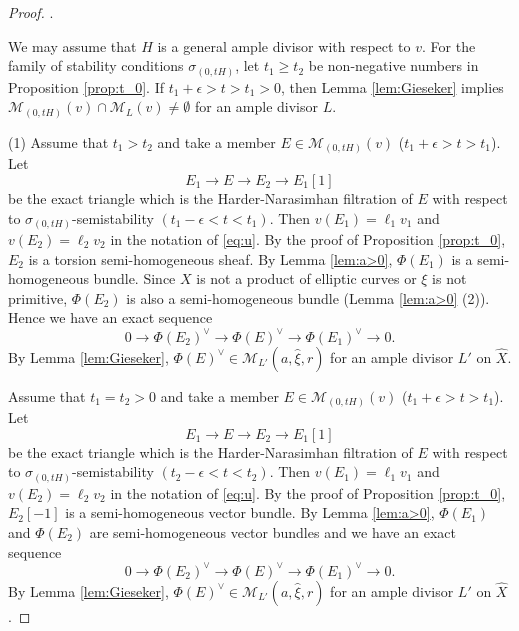 \documentclass[10pt]{amsart}
\def\cal{\mathcal}
\newenvironment{NB}{
\color{red}{\bf NB}. \footnotesize 
}{}
\newcommand{\Coh}{\operatorname{Coh}}
\newcommand{\rk}{\operatorname{rk}}
\numberwithin{equation}{section}
\theoremstyle{plain}
\theoremstyle{definition}
\theoremstyle{remark}
\begin{document}
\begin{proof}
\begin{NB}
We may assume that $H$ is a general ample divisor with respect to $v$.
\end{NB}
For the family of stability conditions
$\sigma_{(0,tH)}$, let $t_1 \geq t_2$ be non-negative numbers in Proposition \ref{prop:t_0}.
If $t_1+\epsilon> t>t_1>0$, then Lemma \ref{lem:Gieseker} implies
${\cal M}_{(0,tH)}(v) \cap {\cal M}_L(v) \ne \emptyset$ for an ample divisor $L$.

(1)
Assume that $t_1>t_2$ and take a member $E \in {\cal M}_{(0,tH)}(v)$ ($t_1+\epsilon> t>t_1$).
Let   
\begin{equation}\label{eq:HNFt1}
E_1 \to E \to E_2 \to E_1[1]
\end{equation}
be the exact triangle
which is the Harder-Narasimhan filtration of $E$ 
with respect to $\sigma_{(0,tH)}$-semistability $(t_1-\epsilon<t<t_1)$. 
Then $v(E_1)=\ell_1 v_1$ and $v(E_2)=\ell_2 v_2$ in the notation of \eqref{eq:u}.
By the proof of Proposition \ref{prop:t_0},
$E_2$ is a torsion semi-homogeneous sheaf.
By Lemma \ref{lem:a>0}, $\Phi(E_1)$ is a semi-homogeneous bundle.
Since $X$ is not a product of elliptic curves or $\xi$ is not primitive,
$\Phi(E_2)$
is also a semi-homogeneous bundle (Lemma \ref{lem:a>0} (2)).
Hence we have an exact sequence
$$
0 \to \Phi(E_2)^{\vee} \to \Phi(E)^{\vee} \to \Phi(E_1)^{\vee} \to 0.
$$
By Lemma \ref{lem:Gieseker}, 
$\Phi(E)^{\vee} \in {\cal M}_{L'}(a,\widehat{\xi},r)$ for an ample divisor $L'$ 
on $\widehat{X}$.

Assume that $t_1=t_2>0$
and take a member $E \in {\cal M}_{(0,tH)}(v)$ ($t_1+\epsilon> t>t_1$).
Let   
\begin{equation}\label{eq:HNFt0}
E_1 \to E \to E_2 \to E_1[1]
\end{equation}
be the exact triangle
which is the Harder-Narasimhan filtration of $E$ 
with respect to $\sigma_{(0,tH)}$-semistability $(t_2-\epsilon <t<t_2)$. 
Then $v(E_1)=\ell_1 v_1$ and $v(E_2)=\ell_2 v_2$ in the notation of \eqref{eq:u}.
By the proof of Proposition \ref{prop:t_0},
$E_2[-1]$ is a semi-homogeneous vector bundle.
By Lemma \ref{lem:a>0},
$\Phi(E_1) $ and $\Phi(E_2)$
are semi-homogeneous vector bundles
and we have an exact sequence
$$
0 \to \Phi(E_2)^{\vee} \to \Phi(E)^{\vee} \to \Phi(E_1)^{\vee} \to 0.
$$
By Lemma \ref{lem:Gieseker}, 
$\Phi(E)^{\vee} \in {\cal M}_{L'}(a,\widehat{\xi},r)$ for an ample divisor $L'$
on $\widehat{X}$.


\end{proof}
\end{document}
